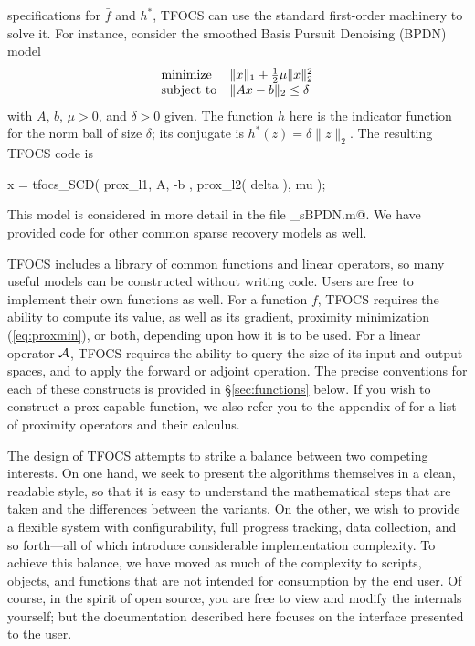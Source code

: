 \documentclass{article}
\begin{document}
specifications for $\bar{f}$ and $h^*$, TFOCS can use the standard
first-order machinery to solve it. For instance,
consider the smoothed Basis Pursuit Denoising (BPDN) model
\begin{equation}
	\begin{array}{ll}
		\text{minimize}   & \|x\|_1+{\textstyle\frac{1}{2}}\mu\|x\|_2^2 \\
		\text{subject to} & \|Ax-b\|_2 \leq \delta
	\end{array}
\end{equation}
with $A$, $b$, $\mu>0$, and $\delta>0$ given. The function $h$
here is the indicator function for the norm ball of size $\delta$; its conjugate
is $h^*(z)=\delta\|z\|_2$. The resulting TFOCS code is
\begin{code}
	x = tfocs_SCD( prox_l1, { A, -b }, prox_l2( delta ), mu  );
\end{code}
This model is considered in more detail in the file \verb@solver_sBPDN.m@.
We have provided code for other common sparse recovery models
as well.

TFOCS includes a library of common functions and linear
operators, so many useful models can be constructed without
writing code. Users are free to implement their own functions as well.
For a function $f$, TFOCS requires the ability to compute its value,
as well as its gradient, proximity minimization
(\ref{eq:proxmin}), or both, depending upon how it is to be used.
For a linear operator $\mathcal{A}$, TFOCS requires the ability to query
the size of its input and output spaces, and to
apply the forward or adjoint operation.
The precise conventions for each of these constructs is
provided in \S\ref{sec:functions} below. If you wish to
construct a prox-capable function, we also refer you
to the appendix of \cite{prox} for a list of proximity operators
and their calculus.

The design of TFOCS attempts to strike a balance
between two competing interests. On one hand, we seek to present
the algorithms themselves in a clean, readable
style, so that it is easy to understand the mathematical steps
that are taken and the differences between the variants. On
the other, we wish to provide a flexible system with 
configurability, full progress tracking, data collection, and
so forth---all of which introduce considerable implementation
complexity. To achieve this balance, we have moved as much of the
complexity to scripts, objects, and functions that are not intended for
consumption by the end user. Of course, in the spirit of open
source, you are free to view and modify the internals yourself;
but the documentation described here focuses on the interface
presented to the user.
\end{document}
